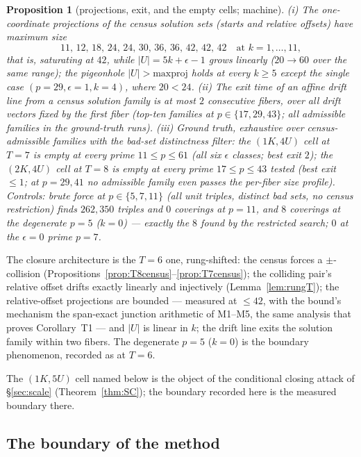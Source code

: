 \documentclass[11pt,a4paper]{article}
\numberwithin{equation}{section}
\theoremstyle{plain}
\theoremstyle{plain}
\newtheorem{proposition}[theorem]{Proposition}
\theoremstyle{definition}
\theoremstyle{remark}
\begin{document}
\begin{proposition}[projections, exit, and the empty cells; machine]
\label{prop:shearT78}
\textup{(i)} The one-coordinate projections of the census solution sets
(starts and relative offsets) have maximum size
\[
11,\,12,\,18,\,24,\,24,\,30,\,36,\,36,\,42,\,42,\,42
\quad\text{at }k=1,\dots,11,
\]
that is, \emph{saturating at $42$}, while
$|U|=5k+\epsilon-1$ grows linearly ($20\to60$ over the same range); the
pigeonhole $|U|>\text{maxproj}$ holds at every $k\ge5$ except the single
case $(p{=}29,\epsilon{=}1,k{=}4)$, where $20<24$. \textup{(ii)} The
exit time of an affine drift line from a census solution family is at
most $2$ consecutive fibers, over all drift vectors fixed by the first
fiber (top-ten families at $p\in\{17,29,43\}$; all admissible families
in the ground-truth runs). \textup{(iii)} Ground truth, exhaustive over
census-admissible families with the bad-set distinctness filter: the
$(1K,4U)$ cell at $T=7$ is \emph{empty} at every prime
$11\le p\le61$ (all six $\epsilon$ classes; best exit $2$); the
$(2K,4U)$ cell at $T=8$ is \emph{empty} at every prime $17\le p\le43$
tested (best exit $\le1$; at $p=29,41$ no admissible family even passes
the per-fiber size profile). Controls: brute force at $p\in\{5,7,11\}$
(all unit triples, distinct bad sets, no census restriction) finds
$262{,}350$ triples and $0$ coverings at $p=11$, and $8$ coverings at
the degenerate $p=5$ ($k=0$) --- exactly the $8$ found by the
restricted search; $0$ at the $\epsilon=0$ prime $p=7$.
\end{proposition}

The closure architecture is the $T=6$ one, rung-shifted: the census
forces a $\pm$-collision (Propositions~\ref{prop:T8census}--\ref{prop:T7census});
the colliding pair's relative offset drifts exactly linearly and
injectively (Lemma~\ref{lem:rungT}); the relative-offset projections are
bounded --- measured at $\le42$, with the bound's mechanism the
span-exact junction arithmetic of M1--M5, the same analysis that proves
Corollary~T1 --- and $|U|$ is linear in $k$; the drift line exits the
solution family within two fibers. The degenerate $p=5$ ($k=0$) is the
boundary phenomenon, recorded as at $T=6$.

The $(1K,5U)$ cell named below is the object of the conditional
closing attack of \S\ref{sec:scale} (Theorem~\ref{thm:SC}); the boundary
recorded here is the measured boundary there.

\subsection{The boundary of the method}
\end{document}
